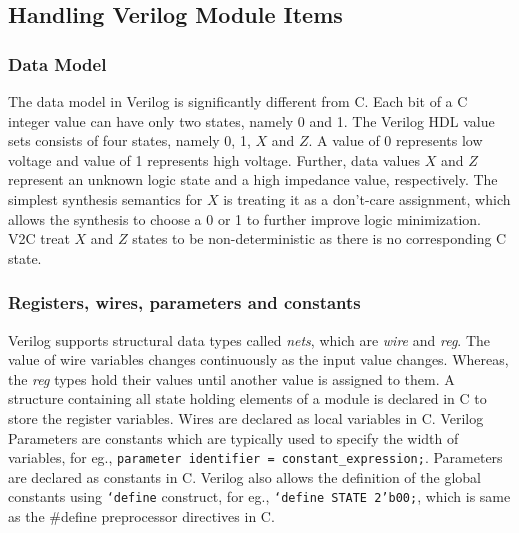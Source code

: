 %
\subsection{Handling Verilog Module Items}
%
\subsubsection{Data Model} The data model in Verilog is significantly 
different from C.  Each bit of a C integer value can have 
only two states, namely 0 and 1.  The Verilog HDL
value sets consists of four states, namely 0, 1, $X$ and $Z$.  A value of 0
represents low voltage and value of 1 represents high voltage.  Further,
data values $X$ and $Z$ represent an unknown logic state and a 
high impedance value, respectively.  The simplest synthesis semantics 
for $X$ is treating it as a don't-care assignment, which allows the 
synthesis to choose a 0 or 1 to further improve logic minimization.
V2C treat $X$ and $Z$ states to be non-deterministic as there is no
corresponding C state. 

\subsubsection{Registers, wires, parameters and constants} Verilog supports structural 
data types called \emph{nets}, which are \emph{wire}
and \emph{reg}. The value of wire variables changes 
continuously as the input value changes.  Whereas, 
the \emph{reg} types hold their values until another value is 
assigned to them.  A structure containing all state holding
elements of a module is declared in C to store the register
variables. Wires are declared as local variables in C.  
Verilog Parameters are constants which 
are typically used to specify the width of variables,
for eg., \texttt{parameter identifier = constant\_expression;}.
Parameters are declared as constants in C.  
Verilog also allows the definition of the global constants 
using \texttt{`define} construct, for eg., \texttt{`define STATE 2'b00;},
which is same as the \#define preprocessor directives in C.

